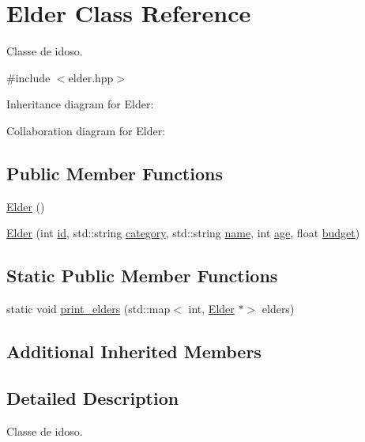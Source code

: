 \hypertarget{class_elder}{}\section{Elder Class Reference}
\label{class_elder}


Classe de idoso.  




{\ttfamily \#include $<$elder.\+hpp$>$}



Inheritance diagram for Elder\+:


Collaboration diagram for Elder\+:
\subsection*{Public Member Functions}
\begin{DoxyCompactItemize}
\item 
\hyperlink{class_elder_ad4acbee8da75a15c0296c90a5b917297}{Elder} ()
\item 
\hyperlink{class_elder_a4ce0094ee5270ed7b1fcfdeecbea952f}{Elder} (int \hyperlink{class_user_aa7e6e39b43020bbe9c3a196b3689b0f7}{id}, std\+::string \hyperlink{class_user_a4216a4a01d8b3b036de85c5238d79cea}{category}, std\+::string \hyperlink{class_user_a085d8d69282b6298964eab8351584536}{name}, int \hyperlink{class_user_aa5829689588d1f982e1a69b73bd68655}{age}, float \hyperlink{class_user_a9c4a23a62f53b4c1c289c27785a5868f}{budget})
\end{DoxyCompactItemize}
\subsection*{Static Public Member Functions}
\begin{DoxyCompactItemize}
\item 
static void \hyperlink{class_elder_ac48d707a0cd8be0883a53d7b543de776}{print\+\_\+elders} (std\+::map$<$ int, \hyperlink{class_elder}{Elder} $\ast$$>$ elders)
\end{DoxyCompactItemize}
\subsection*{Additional Inherited Members}


\subsection{Detailed Description}
Classe de idoso. 

